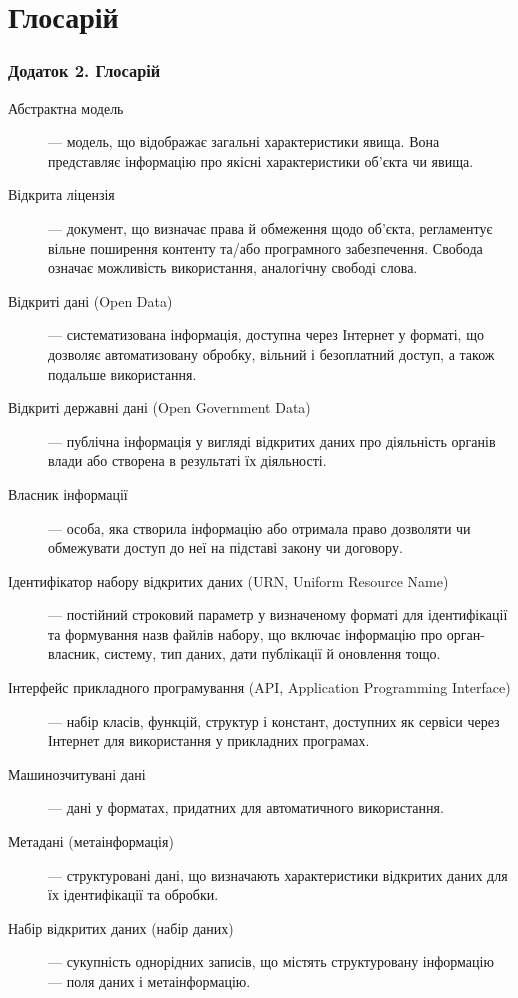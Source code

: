 \chapter{Глосарій}
\label{sec:glossary}

\subsection{Додаток 2. Глосарій}
\begin{description}
\item[Абстрактна модель] — модель, що відображає загальні характеристики явища. Вона представляє інформацію про якісні характеристики об'єкта чи явища.
\item[Відкрита ліцензія] — документ, що визначає права й обмеження щодо об'єкта, регламентує вільне поширення контенту та/або програмного забезпечення. Свобода означає можливість використання, аналогічну свободі слова.
\item[Відкриті дані (Open Data)] — систематизована інформація, доступна через Інтернет у форматі, що дозволяє автоматизовану обробку, вільний і безоплатний доступ, а також подальше використання.
\item[Відкриті державні дані (Open Government Data)] — публічна інформація у вигляді відкритих даних про діяльність органів влади або створена в результаті їх діяльності.
\item[Власник інформації] — особа, яка створила інформацію або отримала право дозволяти чи обмежувати доступ до неї на підставі закону чи договору.
\item[Ідентифікатор набору відкритих даних (URN, Uniform Resource Name)] — постійний строковий параметр у визначеному форматі для ідентифікації та формування назв файлів набору, що включає інформацію про орган-власник, систему, тип даних, дати публікації й оновлення тощо.
\item[Інтерфейс прикладного програмування (API, Application Programming Interface)] — набір класів, функцій, структур і констант, доступних як сервіси через Інтернет для використання у прикладних програмах.
\item[Машинозчитувані дані] — дані у форматах, придатних для автоматичного використання.
\item[Метадані (метаінформація)] — структуровані дані, що визначають характеристики відкритих даних для їх ідентифікації та обробки.
\item[Набір відкритих даних (набір даних)] — сукупність однорідних записів, що містять структуровану інформацію — поля даних і метаінформацію.
\end{description}
